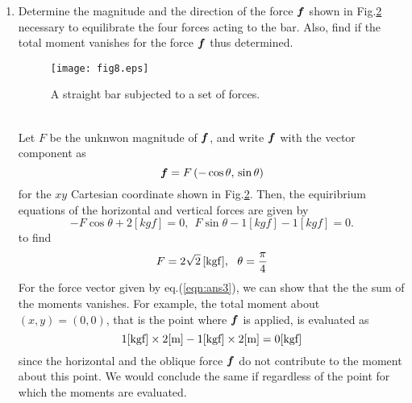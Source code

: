 \documentclass[10pt,a4j]{article}
\begin{document}
\begin{enumerate}
{\begin{figure}[h]
		\label{fig:fig6_1}
		\end{figure}
	}
\item
	Determine the magnitude and the direction of the force $\mbox{\boldmath $f$}$ shown in 
	Fig.\ref{fig:fig8} necessary to equilibrate the four forces acting to the bar.
	Also, find if the total moment vanishes for the force $\mbox{\boldmath $f$}$ thus determined.  
	\begin{figure}[h]
		\begin{center}
		\texttt{[image: fig8.eps]} 
		\end{center}
		\caption{A straight bar subjected to a set of forces.} 
		\label{fig:fig8}
	\end{figure}
	\\

	{\small
		Let $F$ be the unknwon magnitude of $\mbox{\boldmath $f$}$, and write $\mbox{\boldmath $f$}$ with 
		the vector component as 
		\[
			\mbox{\boldmath $f$}=F \left( -\cos\theta,\, \sin\theta \right)
		\]
		for the $xy$ Cartesian coordinate shown in Fig.\ref{fig:fig8}. 
		Then, the equiribrium equations of the horizontal and vertical forces are 
		given by 
		\[
			-F\cos\theta + 2[kgf]=0, \ \ 
			F\sin\theta -1[kgf]-1[kgf]=0.
		\]
		to find 
		\begin{equation}
			F=2\sqrt{2} \,[{\rm kgf}], \ \ \theta=\frac{\pi}{4}
			\label{eqn:ans3}
		\end{equation}
		For the force vector given by eq.(\ref{eqn:ans3}), we can show that the 
		the sum of the moments vanishes.
		For example, the total moment about $(x,y)=(0,0)$, that is the point where $\mbox{\boldmath $f$}$ 
		is applied, is evaluated as  
		\[
			{\rm 1[kgf] \times 2[m] -1[kgf] \times 2[m]=0 [kgf] }
		\]
		since the horizontal and the oblique force $\mbox{\boldmath $f$}$ do not contribute to 
		the moment about this point. We would conclude the same if 
		regardless of the point for which the moments are evaluated. 	
	}

\end{enumerate}
\end{document}
